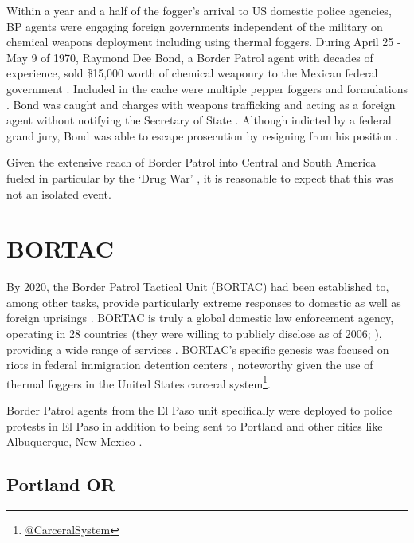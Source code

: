 \documentclass[
  11pt,
  titlepage]{krantz}
\renewcommand{\href}[2]{#2\footnote{\url{#1}}}
\begin{document}
Within a year and a half of the fogger's arrival to US domestic police agencies, BP agents were engaging foreign governments independent of the military on chemical weapons deployment including using thermal foggers.
During April 25 - May 9 of 1970, Raymond Dee Bond, a Border Patrol agent with decades of experience, sold \$15,000 worth of chemical weaponry to the Mexican federal government \citep{ValleyMorningStar1973_08_04}.
Included in the cache were multiple pepper foggers and formulations \citep{ValleyMorningStar1973_08_04}.
Bond was caught and charges with weapons trafficking and acting as a foreign agent without notifying the Secretary of State \citep{DailyNews1972_10_27}.
Although indicted by a federal grand jury, Bond was able to escape prosecution by resigning from his position \citep{ValleyMorningStar1973_08_04}.

Given the extensive reach of Border Patrol into Central and South America fueled in particular by the `Drug War' \citep{Chepesiuk1999}, it is reasonable to expect that this was not an isolated event.

\hypertarget{bortac}{%
\section*{BORTAC}\label{bortac}}


By 2020, the Border Patrol Tactical Unit (BORTAC) had been established to, among other tasks, provide particularly extreme responses to domestic as well as foreign uprisings \citep{CBP2006, CBP2014, CBP2018}.
BORTAC is truly a global domestic law enforcement agency, operating in 28 countries (they were willing to publicly disclose as of 2006; \citet{CBP2006}), providing a wide range of services \citep{CBP2014, Miller2019}.
BORTAC's specific genesis was focused on riots in federal immigration detention centers \citep{CBP2006, CBP2014}, noteworthy given the use of thermal foggers in the United States \href{@CarceralSystem}{carceral system}.

Border Patrol agents from the El Paso unit specifically were deployed to police protests in El Paso in addition to being sent to Portland and other cities like Albuquerque, New Mexico \citep{Borunda2020}.

\hypertarget{PortlandOR2020_2021}{%
\subsection*{Portland OR}\label{PortlandOR2020_2021}}
\end{document}
